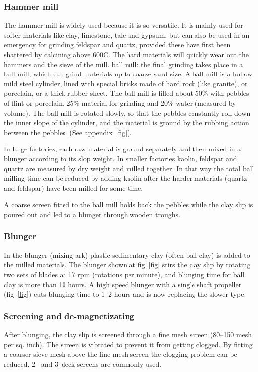 \subsubsection{Hammer mill}
The hammer mill is widely used because it is so versatile. It is mainly used 
for softer materials like clay, limestone, talc and gypsum, but can also be 
used in an emergency for grinding feldspar and quartz, provided these have 
first been shattered by calcining above 600\degree C. The hard materials will 
quickly wear out the hammers and the sieve of the mill. ball mill: the final 
grinding takes place in a ball mill, which can grind materials up to coarse 
sand size. A ball mill is a hollow mild steel cylinder, lined with special 
bricks made of hard rock (like granite), or porcelain, or a thick rubber sheet. 
The ball mill is filled about 50\% with pebbles of flint or porcelain, 25\% 
material for grinding and 20\% water (measured by volume). The ball mill is 
rotated slowly, so that the pebbles constantly roll down the inner slope of the 
cylinder, and the material is ground by the rubbing action between the pebbles. 
(See appendix~\ref{fig}).

In large factories, each raw material is ground separately and then mixed in a 
blunger according to its slop weight. In smaller factories kaolin, feldspar and 
quartz are measured by dry weight and milled together. In that way the total 
ball milling time can be reduced by adding kaolin after the harder materials 
(quartz and feldspar) have been milled for some time.

A coarse screen fitted to the ball mill holds back the pebbles while the clay 
slip is poured out and led to a blunger through wooden troughs.
\subsubsection{Blunger}
In the blunger (mixing ark) plastic sedimentary clay (often ball clay) is added 
to the milled materials. The blunger shown at fig~\ref{fig} stirs the clay slip 
by rotating two sets of blades at 17 rpm (rotations per minute), and blunging 
time for ball clay is more than 10 hours. A high speed blunger with a single 
shaft propeller (fig~\ref{fig}) cuts blunging time to 1--2 hours and is now 
replacing the slower type.
\subsubsection{Screening and de-magnetizating}
After blunging, the clay slip is screened through a fine mesh screen (80--150 
mesh per sq. inch). The screen is vibrated to prevent it from getting clogged. 
By fitting a coarser sieve mesh above the fine mesh screen the clogging problem 
can be reduced. 2-- and 3--deck screens are commonly used.


